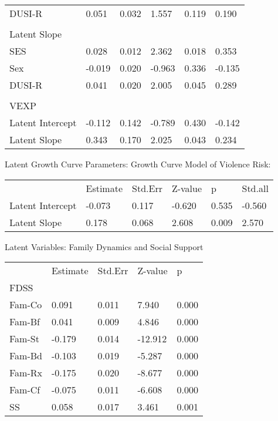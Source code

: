 \documentclass[utf8]{article}
\begin{document}
\begin{table}[]
\begin{tabular}{llllll}
DUSI-R               & 0.051    & 0.032   & 1.557   & 0.119 & 0.190   \\
                     &          &         &         &       &         \\
Latent Slope         &          &         &         &       &         \\
SES                  & 0.028    & 0.012   & 2.362   & 0.018 & 0.353   \\
Sex                  & -0.019   & 0.020   & -0.963  & 0.336 & -0.135  \\
DUSI-R               & 0.041    & 0.020   & 2.005   & 0.045 & 0.289   \\
                     &          &         &         &       &         \\
VEXP                 &          &         &         &       &         \\
Latent Intercept     & -0.112   & 0.142   & -0.789  & 0.430 & -0.142  \\
Latent Slope         & 0.343    & 0.170   & 2.025   & 0.043 & 0.234  
\end{tabular}
\end{table}

Latent Growth Curve Parameters: Growth Curve Model of Violence Risk:
\begin{table}[]
\begin{tabular}{llllll}
                 & Estimate & Std.Err & Z-value & p     & Std.all \\
Latent Intercept & -0.073   & 0.117   & -0.620  & 0.535 & -0.560  \\
Latent Slope     & 0.178    & 0.068   & 2.608   & 0.009 & 2.570  
\end{tabular}
\end{table}


Latent Variables: Family Dynamics and Social Support
\begin{table}[]
\begin{tabular}{lllll}
       & Estimate & Std.Err & Z-value & p     \\
FDSS   &          &         &         &       \\
Fam-Co & 0.091    & 0.011   & 7.940   & 0.000 \\
Fam-Bf & 0.041    & 0.009   & 4.846   & 0.000 \\
Fam-St & -0.179   & 0.014   & -12.912 & 0.000 \\
Fam-Bd & -0.103   & 0.019   & -5.287  & 0.000 \\
Fam-Rx & -0.175   & 0.020   & -8.677  & 0.000 \\
Fam-Cf & -0.075   & 0.011   & -6.608  & 0.000 \\
SS     & 0.058    & 0.017   & 3.461   & 0.001
\end{tabular}
\end{table}
\end{document}
